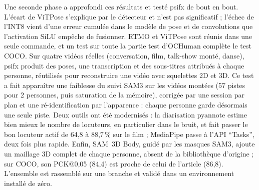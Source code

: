 \documentclass[11pt,a4paper]{report}
\newcommand{\code}[1]{\texttt{\detokenize{#1}}}
\begin{document}
Une seconde phase a approfondi ces résultats et testé psifx de bout en bout. L'écart de ViTPose s'explique par le
détecteur et n'est pas significatif ; l'échec de l'INT8 vient d'une erreur cumulée dans le modèle de pose et de
convolutions que l'activation SiLU empêche de fusionner. RTMO et ViTPose sont réunis dans une seule commande, et un
test sur toute la partie test d'OCHuman complète le test COCO. Sur quatre vidéos réelles (conversation, film,
talk-show monté, danse), psifx produit des poses, une transcription et des sous-titres attribués à chaque personne,
réutilisés pour reconstruire une vidéo avec squelettes 2D et 3D. Ce test a fait apparaître une faiblesse du suivi
SAM3 sur les vidéos montées (57 pistes pour 2 personnes, puis saturation de la mémoire), corrigée par une session
par plan et une ré-identification par l'apparence : chaque personne garde désormais une seule piste. Deux outils ont
été modernisés : la diarisation pyannote \code{community-1} estime bien mieux le nombre de locuteurs, en particulier
dans le bruit, et fait passer le bon locuteur actif de 64,8 à 88,7\,\% sur le film ; MediaPipe passe à l'API
\enquote{Tasks}, deux fois plus rapide. Enfin, SAM~3D Body, guidé par les masques SAM3, ajoute un maillage 3D
complet de chaque personne, absent de la bibliothèque d'origine ; sur COCO, son PCK@0,05 (84,4) est proche de celui
de l'article (86,8). L'ensemble est rassemblé sur une branche et validé dans un environnement installé de zéro.
\end{document}
